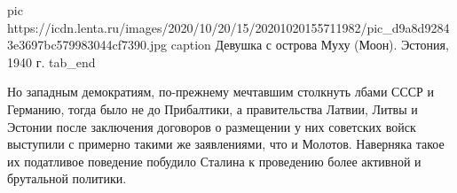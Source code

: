 	pic https://icdn.lenta.ru/images/2020/10/20/15/20201020155711982/pic_d9a8d92843e3697bc579983044cf7390.jpg
	caption Девушка с острова Муху (Моон). Эстония, 1940 г. 
tab_end
\fi

Но западным демократиям, по-прежнему мечтавшим столкнуть лбами СССР и Германию,
тогда было не до Прибалтики, а правительства Латвии, Литвы и Эстонии после
заключения договоров о размещении у них советских войск выступили с примерно
такими же заявлениями, что и Молотов. Наверняка такое их податливое поведение
побудило Сталина к проведению более активной и брутальной политики.

